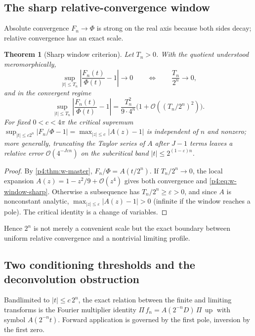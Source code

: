 \documentclass[11pt,oneside]{article}
\numberwithin{equation}{section}
\newtheorem{theorem}{Theorem}[section]
\theoremstyle{definition}
\theoremstyle{remark}
\newcommand{\Up}{\operatorname{up}}
\newcommand{\bigO}{\mathcal O}
\begin{document}
\subsection{The sharp relative-convergence window}

Absolute convergence $F_n\to\Phi$ is strong on the real axis because both
sides decay; relative convergence has an exact scale.

\begin{theorem}[Sharp window criterion]
\label{p4:thm:w-window}
Let $T_n>0$.  With the quotient understood meromorphically,
\begin{equation}
 \sup_{|t|\le T_n}\left|\frac{F_n(t)}{\Phi(t)}-1\right|\longrightarrow0
 \qquad\Longleftrightarrow\qquad
 \frac{T_n}{2^n}\longrightarrow0,
 \label{p4:eq:w-window-iff}
\end{equation}
and in the convergent regime
\begin{equation}
 \sup_{|t|\le T_n}\left|\frac{F_n(t)}{\Phi(t)}-1\right|
 =\frac{T_n^2}{9\cdot4^n}\bigl(1+\bigO((T_n/2^n)^2)\bigr).
 \label{p4:eq:w-window-sharp}
\end{equation}
For fixed $0<c<4\pi$ the critical supremum
$\sup_{|t|\le c2^n}|F_n/\Phi-1|=\max_{|z|\le c}|A(z)-1|$ is independent of
$n$ and nonzero; more generally, truncating the Taylor series of $A$ after
$J-1$ terms leaves a relative error $\bigO(4^{-J\varepsilon n})$ on the
subcritical band $|t|\le2^{(1-\varepsilon)n}$.
\end{theorem}

\begin{proof}
By \cref{p4:thm:w-master}, $F_n/\Phi=A(t/2^n)$.  If $T_n/2^n\to0$, the local
expansion $A(z)=1-z^2/9+\bigO(z^4)$ gives both convergence and
\eqref{p4:eq:w-window-sharp}.  Otherwise a subsequence has
$T_n/2^n\ge\varepsilon>0$, and since $A$ is nonconstant analytic,
$\max_{|z|\le\varepsilon}|A(z)-1|>0$ (infinite if the window reaches a
pole).  The critical identity is a change of variables.
\end{proof}

Hence $2^n$ is not merely a convenient scale but the exact boundary between
uniform relative convergence and a nontrivial limiting profile.

\subsection{Two conditioning thresholds and the deconvolution obstruction}

Bandlimited to $|t|\le c\,2^n$, the exact relation between the finite and
limiting transforms is the Fourier multiplier identity
$\Pi\,f_n=A(2^{-n}D)\,\Pi\,\Up$ with symbol $A(2^{-n}t)$.  Forward
application is governed by the first pole, inversion by the first zero.
\end{document}
